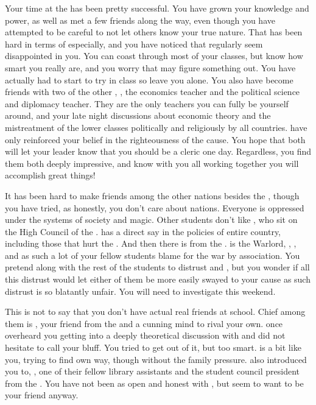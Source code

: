 \documentclass[char]{GL2020}
\begin{document}
Your time at the \pSchool{} has been pretty successful. You have grown your knowledge and power, as well as met a few friends along the way, even though you have attempted to be careful to not let others know your true nature. That has been hard in terms of \cHistory{} especially, and you have noticed that \cHistory{\they} regularly seem\cHistory{\verbs} disappointed in you. You can coast through most of your classes, but \cHistory{\they} know\cHistory{\verbs} how smart you really are, and you worry that \cHistory{\they} may figure something out. You have actually had to start to try in \cHistory{\their} class so \cHistory{\they} leave\cHistory{\verbs} you alone. You also have become friends with two of the other \pGoaties{}, \cChupSecond{\intro}, the economics teacher and \cChupInventor{\intro} the political science and diplomacy teacher. They are the only teachers you can fully be yourself around, and your late night discussions about economic theory and the mistreatment of the lower classes politically and religiously by all countries. have only reinforced your belief in the righteousness of the cause. You hope that both  will let your leader know that you should be a cleric one day. Regardless, you find them both deeply impressive, and know with you all working together you will accomplish great things!

 It has been hard to make friends among the other nations besides the \pFarm{}, though you have tried, as honestly, you don’t care about nations. Everyone is oppressed under the systems of society and magic. Other students don’t like  \cTechStar{\intro}, who sit\cTechStar{\verbs} on the High Council of the \pTech{}. \cTechStar{} has a direct say in the policies of \cTechStar{\their} entire country, including those that hurt the \pFarm{}. And then there is \cWarlordDaughter{\intro} from the \pShip{}. \cWarlordDaughter{} is the \pShippie{} Warlord, \cLoud{\intros}, \cWarlordDaughter{\offspring}, and as such a lot of your fellow students blame \cWarlordDaughter{\them} for the war by association. You pretend along with the rest of the \pFarm{} students to distrust \cTechStar{} and  \cWarlordDaughter{}, but you wonder if all this distrust would let either of them  be more easily swayed to your cause as such distrust is so blatantly unfair. You will need to investigate this weekend.

This is not to say that you don’t have actual real friends at school. Chief among them is \cAmbition{\intro}, your friend from the \pTech{} and a cunning mind to rival your own. \cAmbition{} once overheard you getting into a deeply theoretical discussion with \cChupSecond{} and did not hesitate to call your bluff. You tried to get out of it, but \cAmbition{\theywere} too smart. \cAmbition{} is a bit like you, trying to find \cAmbition{\their} own way, though without the family pressure. \cAmbition{} also introduced you to, \cPresident{\intro}, one of their fellow library assistants and the student council president from the \pShip{}. You have not been as open and honest with \cPresident{}, but \cPresident{\they} seem\cPresident{\verbs} to want to be your friend anyway. 
\end{document}
